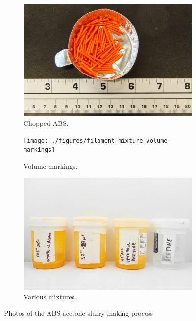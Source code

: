 \begin{figure}[h!]
        \centering
        \begin{subfigure}[b]{0.3\textwidth}
                \includegraphics[width=\textwidth]{./figures/filament-abs-chopped}
                \caption{Chopped ABS.}
                \label{fig:filament-abs-chopped}
        \end{subfigure}%
        \begin{subfigure}[b]{0.3\textwidth}
                \texttt{[image: ./figures/filament-mixture-volume-markings]}
                \caption{Volume markings.}
                \label{fig:filament-mixture-volume-markings}
        \end{subfigure}
        \begin{subfigure}[b]{0.3\textwidth}
                \includegraphics[width=\textwidth]{./figures/filament-mixtures}
                \caption{Various mixtures.}
                \label{fig:filament-mixtures}
        \end{subfigure}
        \caption{Photos of the ABS-acetone slurry-making process}\label{fig:slurry-making}
\end{figure}



